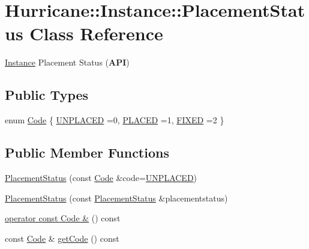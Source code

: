 \hypertarget{classHurricane_1_1Instance_1_1PlacementStatus}{}\section{Hurricane\+:\+:Instance\+:\+:Placement\+Status Class Reference}
\label{classHurricane_1_1Instance_1_1PlacementStatus}


\hyperlink{classHurricane_1_1Instance}{Instance} Placement Status ({\bfseries A\+PI})  


\subsection*{Public Types}
\begin{DoxyCompactItemize}
\item 
enum \hyperlink{classHurricane_1_1Instance_1_1PlacementStatus_af76cc0838783b3eb3a515eb3c3e0f7bf}{Code} \{ \newline
\hyperlink{classHurricane_1_1Instance_1_1PlacementStatus_af76cc0838783b3eb3a515eb3c3e0f7bfa3e19a0a1b3e8c8fd860164df7f935216}{U\+N\+P\+L\+A\+C\+ED} =0, 
\newline
\hyperlink{classHurricane_1_1Instance_1_1PlacementStatus_af76cc0838783b3eb3a515eb3c3e0f7bfaf3589c11ecd7d5de63db24826b74d457}{P\+L\+A\+C\+ED} =1, 
\newline
\hyperlink{classHurricane_1_1Instance_1_1PlacementStatus_af76cc0838783b3eb3a515eb3c3e0f7bfa47be8a40f04081635fe24485ae7c6bd7}{F\+I\+X\+ED} =2
 \}
\end{DoxyCompactItemize}
\subsection*{Public Member Functions}
\begin{DoxyCompactItemize}
\item 
\hyperlink{classHurricane_1_1Instance_1_1PlacementStatus_a29d2678343f4b712a9bbbb8f5460ec11}{Placement\+Status} (const \hyperlink{classHurricane_1_1Instance_1_1PlacementStatus_af76cc0838783b3eb3a515eb3c3e0f7bf}{Code} \&code=\hyperlink{classHurricane_1_1Instance_1_1PlacementStatus_af76cc0838783b3eb3a515eb3c3e0f7bfa3e19a0a1b3e8c8fd860164df7f935216}{U\+N\+P\+L\+A\+C\+ED})
\item 
\hyperlink{classHurricane_1_1Instance_1_1PlacementStatus_a121a628ab6f7a86b99acacc0d874d97b}{Placement\+Status} (const \hyperlink{classHurricane_1_1Instance_1_1PlacementStatus}{Placement\+Status} \&placementstatus)
\item 
\hyperlink{classHurricane_1_1Instance_1_1PlacementStatus_a375d2547ed3e8a127e34b0ee3ca14ad6}{operator const Code \&} () const
\item 
const \hyperlink{classHurricane_1_1Instance_1_1PlacementStatus_af76cc0838783b3eb3a515eb3c3e0f7bf}{Code} \& \hyperlink{classHurricane_1_1Instance_1_1PlacementStatus_aa907067c594076ed8422bf6c949c8731}{get\+Code} () const
\end{DoxyCompactItemize}



